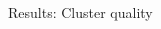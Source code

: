 \documentclass[final]{beamer}
\newcommand{\ubold}{\fontseries{b}\selectfont}  %
\begin{document}
\begin{frame}[t]
\begin{columns}[T]
\begin{column}{.33\linewidth}
\begin{minipage}[T]{.97\textwidth}
{\begin{block}{Results: Cluster quality}
\end{block}

}
\end{minipage}
\end{column}
\end{columns}
\end{frame}
\end{document}
